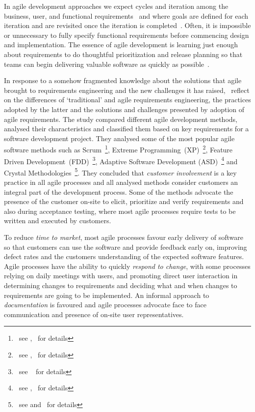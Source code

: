 \documentclass[dissertation,final]{softeng}
\begin{document}
In agile development approaches we expect cycles and iteration among the business, user, and functional requirements~\citep{Wiegers2013} and where goals are defined for each iteration and are revisited once the iteration is completed~\citep{Inayat2015}. Often, it is impossible or unnecessary to fully specify functional requirements before commencing design and implementation. The essence of agile development is learning just enough about requirements to do thoughtful prioritization and release planning so that teams can begin delivering valuable software as quickly as possible~\citep{Wiegers2013}.

In response to a somehow fragmented knowledge about the solutions that agile brought to requirements engineering and the new challenges it has raised,~\citet{Qasaimeh2008} reflect on the differences of `traditional' and agile requirements engineering, the practices adopted by the latter and the solutions and challenges presented by adoption of agile requirements. The study compared different agile development methods, analysed their characteristics and classified them based on key requirements for a software development project. They analysed some of the most popular agile software methods such as Scrum~\footnote{~see ,~ \citet{Schwaber:2001:ASD:559553} for details}, Extreme Programming~(XP)~\footnote{~see ,~ \citet{Beck:1999:EPE:318762} for details}, Feature Driven Development~(FDD)~\footnote{~see ~\citet{Palmer:2001:PGF:600044} for details}, Adaptive Software Development (ASD)~\footnote{~see ,~ \citet{Highsmith:2000:ASD:323922} for details} and Crystal Methodologies~\footnote{~see  and~ \citet{CockburnCrystal2004} for details}. They concluded that \emph{customer involvement} is a key practice in all agile processes and all analysed methods consider customers an integral part of the development process. Some of the methods advocate the presence of the customer on-site to elicit, prioritize and verify requirements and also during acceptance testing, where most agile processes require tests to be written and executed by customers.

To reduce \emph{time to market}, most agile processes favour early delivery of software so that customers can use the software and provide feedback early on, improving defect rates and the customers understanding of the expected software features. Agile processes have the ability to quickly \emph{respond to change}, with some processes relying on daily meetings with users, and promoting direct user interaction in determining changes to requirements and deciding what and when changes to requirements are going to be implemented. An informal approach to \emph{documentation} is favoured and agile processes advocate face to face communication and presence of on-site user representatives.
\end{document}
